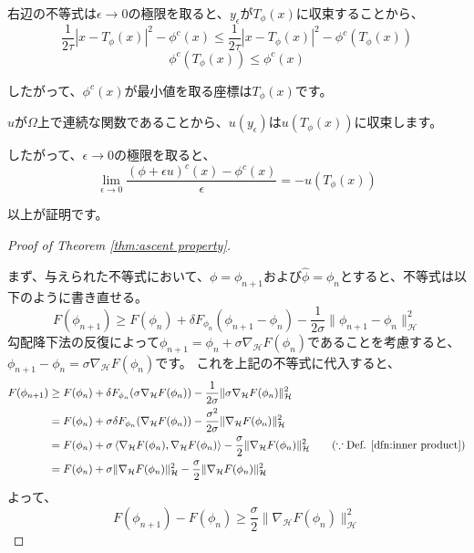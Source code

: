 \documentclass{jsarticle}
\theoremstyle{definition}
\begin{document}
右辺の不等式は$\epsilon \to 0$の極限を取ると、$y_\epsilon$が$T_\phi(x)$に収束することから、
$$\frac{1}{2 \tau} |x - T_\phi(x)|^2 - \phi^c(x) \leq \frac{1}{2 \tau} |x - T_\phi(x)|^2 - \phi^c(T_\phi(x))$$
$$\phi^c(T_\phi(x)) \leq \phi^c(x)$$

したがって、$\phi^c(x)$が最小値を取る座標は$T_\phi(x)$です。

$u$が$\Omega$上で連続な関数であることから、$u(y_\epsilon)$は$u(T_\phi(x))$に収束します。

したがって、$\epsilon \to 0$の極限を取ると、
$$\lim_{\epsilon \to 0} \frac{(\phi + \epsilon u)^c(x) - \phi^c(x)}{\epsilon} = - u(T_\phi(x))$$

以上が証明です。


\begin{proof}[Proof of Theorem \ref{thm:ascent property}]
  \hypertarget{proof:thm:ascent property}{}
  まず、与えられた不等式において、$\phi = \phi_{n+1}$および$\hat{\phi} = \phi_n$とすると、不等式は以下のように書き直せる。
  $$
    F(\phi_{n+1}) \geq F(\phi_n) + \delta F_{\phi_n} (\phi_{n+1} - \phi_n) - \frac{1}{2\sigma} \|\phi_{n+1} - \phi_n\|_\mathcal{H}^2
  $$
  勾配降下法の反復によって$\phi_{n+1} = \phi_n + \sigma \nabla_\mathcal{H} F(\phi_n)$であることを考慮すると、$\phi_{n+1} - \phi_n = \sigma \nabla_\mathcal{H} F(\phi_n)$です。
  これを上記の不等式に代入すると、
  {\color{teal}
  \begin{align*}
    F(\phi_{n+1})   &\geq F(\phi_n) + \delta F_{\phi_n} (\sigma \nabla_\mathcal{H} F(\phi_n)) - \frac{1}{2\sigma} \|\sigma \nabla_\mathcal{H} F(\phi_n)\|_\mathcal{H}^2 \\
                    &= F(\phi_n) + \sigma \delta F_{\phi_n} (\nabla_\mathcal{H} F(\phi_n)) - \frac{\sigma^2}{2\sigma} \| \nabla_\mathcal{H} F(\phi_n)\|_\mathcal{H}^2\\
                    &= F(\phi_n) + \sigma \left\langle \nabla_\mathcal{H} F(\phi_n), \nabla_\mathcal{H} F(\phi_n)\right\rangle - \frac{\sigma}{2} \| \nabla_\mathcal{H} F(\phi_n)\|_\mathcal{H}^2 \qquad (\because \text{Def. } \ref{dfn:inner product})\\
                    &= F(\phi_n)  + \sigma \| \nabla_\mathcal{H} F(\phi_n)\|_\mathcal{H}^2 - \frac{\sigma}{2} \| \nabla_\mathcal{H} F(\phi_n)\|_\mathcal{H}^2\\
  \end{align*} 
  }
  よって、
  $$
    F(\phi_{n+1}) - F(\phi_n) \geq \frac{\sigma}{2} \| \nabla_\mathcal{H} F(\phi_n)\|_\mathcal{H}^2
  $$


\end{proof}
\end{document}
